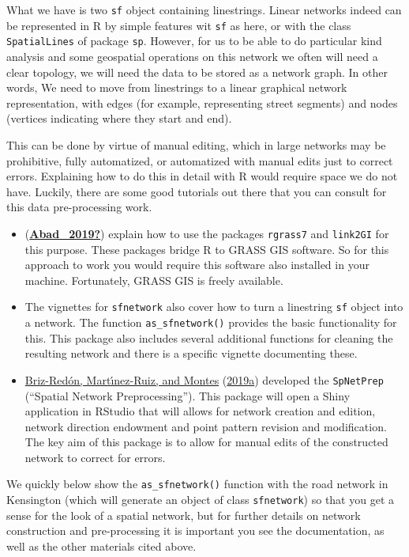 \documentclass[
  krantz2]{krantz}
\providecommand{\tightlist}{%
  \setlength{\itemsep}{0pt}\setlength{\parskip}{0pt}}
\begin{document}
What we have is two \texttt{sf} object containing linestrings. Linear networks indeed can be represented in R by simple features wit \texttt{sf} as here, or with the class \texttt{SpatialLines} of package \texttt{sp}. However, for us to be able to do particular kind analysis and some geospatial operations on this network we often will need a clear topology, we will need the data to be stored as a network graph. In other words, We need to move from linestrings to a linear graphical network representation, with edges (for example, representing street segments) and nodes (vertices indicating where they start and end).

This can be done by virtue of manual editing, which in large networks may be prohibitive, fully automatized, or automatized with manual edits just to correct errors. Explaining how to do this in detail with R would require space we do not have. Luckily, there are some good tutorials out there that you can consult for this data pre-processing work.

\begin{itemize}
\tightlist
\item
  (\protect\hyperlink{ref-Abad_2019}{\textbf{Abad\_2019?}}) explain how to use the packages \texttt{rgrass7} and \texttt{link2GI} for this purpose. These packages bridge R to GRASS GIS software. So for this approach to work you would require this software also installed in your machine. Fortunately, GRASS GIS is freely available.
\item
  The vignettes for \texttt{sfnetwork} also cover how to turn a linestring \texttt{sf} object into a network. The function \texttt{as\_sfnetwork()} provides the basic functionality for this. This package also includes several additional functions for cleaning the resulting network and there is a specific vignette documenting these.
\item
  \protect\hyperlink{ref-BrizRedon_2019a}{Briz-Redón, Martı́nez-Ruiz, and Montes} (\protect\hyperlink{ref-BrizRedon_2019a}{2019a}) developed the \texttt{SpNetPrep} (``Spatial Network Preprocessing''). This package will open a Shiny application in RStudio that will allows for network creation and edition, network direction endowment and point pattern revision and modiﬁcation. The key aim of this package is to allow for manual edits of the constructed network to correct for errors.
\end{itemize}

We quickly below show the \texttt{as\_sfnetwork()} function with the road network in Kensington (which will generate an object of class \texttt{sfnetwork}) so that you get a sense for the look of a spatial network, but for further details on network construction and pre-processing it is important you see the documentation, as well as the other materials cited above.
\end{document}
